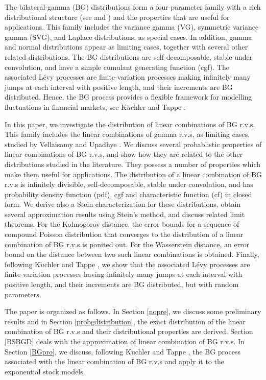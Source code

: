 \documentclass[12pt, a4paper,reqno]{amsart}
\theoremstyle{definition}
\theoremstyle{myremark}
\numberwithin{equation}{section}
\begin{document}
\noindent
The bilateral-gamma (BG) distributions form a four-parameter family with a rich distributional structure (see \cite{bilateral0} and \cite{bilateral1}) and the properties that are useful for applications. This family includes the variance gamma (VG), symmetric variance gamma (SVG), and Laplace distributions, as special cases. In addition,  gamma and normal distributions appear as limiting cases, together with several other related distributions. The BG distributions are self-decomposable, stable under convolution, and have a simple cumulant generating function (cgf). The associated L\'evy processes are finite-variation processes making infinitely many jumps at each interval with positive length, and  their increments are BG distributed. Hence, the BG process provides a flexible framework for modelling fluctuations in financial markets, see K$\ddot{u}$chler and Tappe \cite{bilateral2}. 

\noindent
In this paper, we investigate the distribution of linear combinations of BG r.v.s. This family includes the linear combinations of gamma r.v.s,  as  limiting cases,  studied by Vellaisamy and Upadhye \cite{pvns2009}. We discuss several probablistic properties  of linear combinations of BG r.v.s, and show how they are related to the other distributions studied in the literature. They possess a number  of properties which make them useful for applications. The distribution of a linear combination of BG r.v.s is infinitely divisible, self-decomposable, stable under convolution, and has probability density function (pdf), cgf and characteristic function (cf) in closed form. We  derive also a Stein characterization for these distributions, obtain several approximation results using Stein's method, and discuss  related limit theorems. For the Kolmogorov distance, the error bounds for a sequence of compound Poisson distribution that converges to the distribution of a linear combination of BG r.v.s is ponited out.  For the Wasserstein distance, an error bound on the distance between  two such linear combinations is obtained. Finally, following K$\ddot{u}$chler and Tappe \cite{bilateral2}, we show that the associated L\'evy processes are finite-variation processes having infinitely many jumps at each interval with positive length, and  their increments are BG distributed, but with random parameters. 

\noindent
The paper is organized as follows. In Section \ref{nopre}, we discuss some preliminary results and in   Section \ref{probgdistribution},  the exact distribution of the linear combination of BG r.v.s  and their distributional properties are derived. Section \ref{BSBGD} deals with the approximation of linear combination of BG r.v.s. In Section \ref{BGpro}, we discuss, following K$\ddot{\text{u}}$chler and Tappe \cite{bilateral2},  the BG process associated
with  the linear combination of BG r.v.s and apply it to the exponential stock models.
\end{document}
